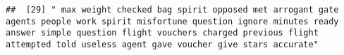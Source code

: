 \documentclass[
]{article}
\begin{document}
\begin{verbatim}
##  [29] " max weight checked bag spirit opposed met arrogant gate agents people work spirit misfortune question ignore minutes ready answer simple question flight vouchers charged previous flight attempted told useless agent gave voucher give stars accurate"                                                                                                                                                                                                                                                                                                                                                                                                                                                                                                                                                                                                                                                                                                                                                                                                                                                                                                                                                                                                                                                                                                                                                                                                                                                                                                                                                                                                                                                                                                                                      

\end{verbatim}
\end{document}
